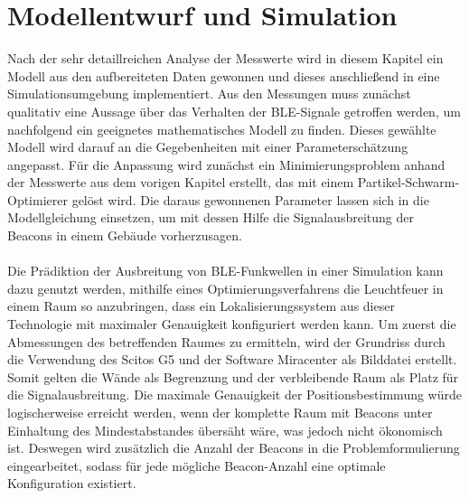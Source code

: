 \chapter{Modellentwurf und Simulation}
Nach der sehr detaillreichen Analyse der Messwerte wird in diesem Kapitel ein Modell aus den aufbereiteten Daten gewonnen und dieses anschließend in eine Simulationsumgebung implementiert. Aus den Messungen muss zunächst qualitativ eine Aussage über das Verhalten der BLE-Signale getroffen werden, um nachfolgend ein geeignetes mathematisches Modell zu finden. Dieses gewählte Modell wird darauf an die Gegebenheiten mit einer Parameterschätzung angepasst. Für die Anpassung wird zunächst ein Minimierungsproblem anhand der Messwerte aus dem vorigen Kapitel erstellt, das mit einem Partikel-Schwarm-Optimierer gelöst wird. Die daraus gewonnenen Parameter lassen sich in die Modellgleichung einsetzen, um mit dessen Hilfe die Signalausbreitung der Beacons in einem Gebäude vorherzusagen. \\ \\
Die Prädiktion der Ausbreitung von BLE-Funkwellen in einer Simulation kann dazu genutzt werden, mithilfe eines Optimierungsverfahrens die Leuchtfeuer in einem Raum so anzubringen, dass ein Lokalisierungssystem aus dieser Technologie mit maximaler Genauigkeit konfiguriert werden kann. Um zuerst die Abmessungen des betreffenden Raumes zu ermitteln, wird der Grundriss durch die Verwendung des Scitos G5 und der Software Miracenter als Bilddatei erstellt. Somit gelten die Wände als Begrenzung und der verbleibende Raum als Platz für die Signalausbreitung. Die maximale Genauigkeit der Positionsbestimmung würde logischerweise erreicht werden, wenn der komplette Raum mit Beacons unter Einhaltung des Mindestabstandes übersäht wäre, was jedoch nicht ökonomisch ist. Deswegen wird zusätzlich die Anzahl der Beacons in die Problemformulierung eingearbeitet, sodass für jede mögliche Beacon-Anzahl eine optimale Konfiguration existiert. 
